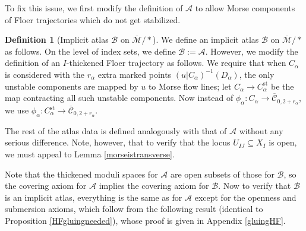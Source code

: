 \documentclass[12pt]{article}
\theoremstyle{definition}
\newtheorem{definition}[theorem]{Definition}
\theoremstyle{remark}
\numberwithin{equation}{subsection}
\newcommand{\A}{\mathcal A}
\newcommand{\B}{\mathcal B}
\newcommand{\Mbar}{\overline{\mathcal M}}
\newcommand{\Cbar}{\overline{\mathcal C}}
\newcommand{\st}{\mathrm{st}}
\begin{document}
To fix this issue, we first modify the definition of $\A$ to allow Morse components of Floer trajectories which do not get stabilized.

\begin{definition}[Implicit atlas $\B$ on $\Mbar/\ast$]\label{modifiedatlasforMorse}
We define an implicit atlas $\B$ on $\Mbar/\ast$ as follows.  On the level of index sets, we define $\B:=\A$.  However, we modify the definition of an $I$-thickened Floer trajectory as follows.  We require that when $C_\alpha$ is considered with the $r_\alpha$ extra marked points $(u|C_\alpha)^{-1}(D_\alpha)$, the only unstable components are mapped by $u$ to Morse flow lines; let $C_\alpha\to C_\alpha^\st$ be the map contracting all such unstable components.  Now instead of $\phi_\alpha:C_\alpha\to\Cbar_{0,2+r_\alpha}$, we use $\phi_\alpha:C_\alpha^\st\to\Cbar_{0,2+r_\alpha}$.

The rest of the atlas data is defined analogously with that of $\A$ without any serious difference.  Note, however, that to verify that the locus $U_{IJ}\subseteq X_I$ is open, we must appeal to Lemma \ref{morseistransverse}.
\end{definition}

Note that the thickened moduli spaces for $\A$ are open subsets of those for $\B$, so the covering axiom for $\A$ implies the covering axiom for $\B$.  Now to verify that $\B$ is an implicit atlas, everything is the same as for $\A$ except for the openness and submersion axioms, which follow from the following result (identical to Proposition \ref{HFgluingneeded}), whose proof is given in Appendix \ref{gluingHF}.
\end{document}

